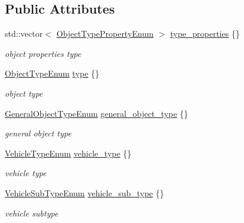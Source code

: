 \subsection*{Public Attributes}
\begin{DoxyCompactItemize}
\item 
std\+::vector$<$ \hyperlink{structmaf__perception__interface_1_1ObjectTypePropertyEnum}{Object\+Type\+Property\+Enum} $>$ \hyperlink{structmaf__perception__interface_1_1ObjectTypeInfo_a50f53e255edca1e57aa10d785475e857}{type\+\_\+properties} \{\}
\begin{DoxyCompactList}\small\item\em object properties type \end{DoxyCompactList}\item 
\hyperlink{structmaf__perception__interface_1_1ObjectTypeEnum}{Object\+Type\+Enum} \hyperlink{structmaf__perception__interface_1_1ObjectTypeInfo_a89e182fadbffe4d1438c434909544301}{type} \{\}
\begin{DoxyCompactList}\small\item\em object type \end{DoxyCompactList}\item 
\hyperlink{structmaf__perception__interface_1_1GeneralObjectTypeEnum}{General\+Object\+Type\+Enum} \hyperlink{structmaf__perception__interface_1_1ObjectTypeInfo_a6f2ade1dde6684a63abd80f1e86fcba5}{general\+\_\+object\+\_\+type} \{\}
\begin{DoxyCompactList}\small\item\em general object type \end{DoxyCompactList}\item 
\hyperlink{structmaf__perception__interface_1_1VehicleTypeEnum}{Vehicle\+Type\+Enum} \hyperlink{structmaf__perception__interface_1_1ObjectTypeInfo_ad516ddb15ac1e6301cf4863469dd9be1}{vehicle\+\_\+type} \{\}
\begin{DoxyCompactList}\small\item\em vehicle type \end{DoxyCompactList}\item 
\hyperlink{structmaf__perception__interface_1_1VehicleSubTypeEnum}{Vehicle\+Sub\+Type\+Enum} \hyperlink{structmaf__perception__interface_1_1ObjectTypeInfo_a17a78b71d322b0d5e7455ec3e896f042}{vehicle\+\_\+sub\+\_\+type} \{\}
\begin{DoxyCompactList}\small\item\em vehicle subtype \end{DoxyCompactList}\item 

\end{DoxyCompactItemize}
